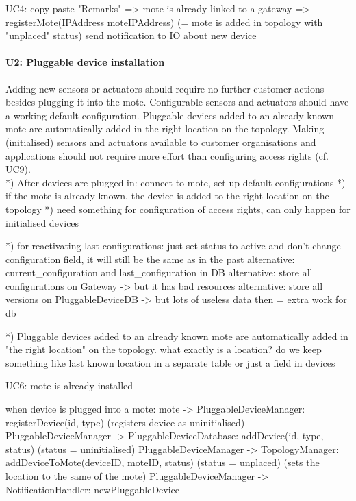         UC4:
            copy paste "Remarks" => mote is already linked to a gateway
            => registerMote(IPAddress moteIPAddress) (= mote is added in topology with "unplaced" status)
            send notification to IO about new device



    \paragraph{U2: Pluggable device installation}
        Adding new sensors or actuators should require no further customer
        actions besides plugging it into the mote. Configurable sensors and
        actuators should have a working default configuration.
        Pluggable devices added to an already known mote are automatically
        added in the right location on the topology.
        Making (initialised) sensors and actuators available to customer
        organisations and applications should not require more effort than
        configuring access rights (cf. UC9). \\
        *) After devices are plugged in: connect to mote, set up default configurations
        *) if the mote is already known, the device is added to the right location on the topology
        *) need something for configuration of access rights, can only happen for initialised devices

        *) for reactivating last configurations: just set status to active and don't change configuration field, it will still be the same as in the past
            alternative: current_configuration and last_configuration in DB
            alternative: store all configurations on Gateway -> but it has bad resources
            alternative: store all versions on PluggableDeviceDB -> but lots of useless data then = extra work for db

        *) Pluggable devices added to an already known mote are automatically added in "the right location" on the topology.
            what exactly is a location?
            do we keep something like last known location in a separate table or just a field in devices

        UC6:
            mote is already installed

            when device is plugged into a mote:
                mote -> PluggableDeviceManager: registerDevice(id, type) (registers device as uninitialised)
                PluggableDeviceManager -> PluggableDeviceDatabase: addDevice(id, type, status) (status = uninitialised)
                PluggableDeviceManager -> TopologyManager: addDeviceToMote(deviceID, moteID, status) (status = unplaced) (sets the location to the same of the mote)
                PluggableDeviceManager -> NotificationHandler: newPluggableDevice

